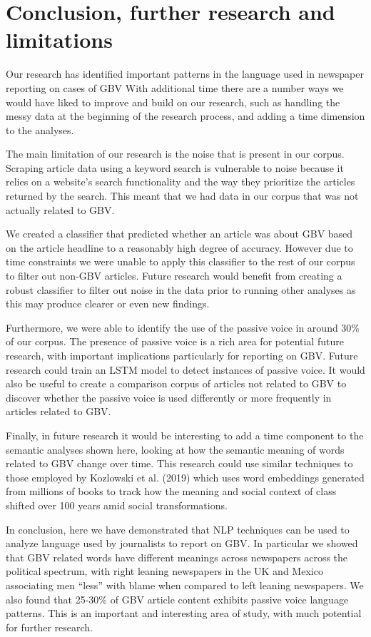 \documentclass{article}
\begin{document}
\section{Conclusion, further research and limitations}{
Our research has identified important patterns in the language used in newspaper reporting on cases of GBV  With additional time there are a number ways we would have liked to improve and build on our research, such as handling the messy data at the beginning of the research process, and adding a time dimension to the analyses.

The main limitation of our research is the noise that is present in our corpus. Scraping article data using a keyword search is vulnerable to noise because it relies on a website’s search functionality and the way they prioritize the articles returned by the search. This meant that we had data in our corpus that was not actually related to GBV. 

We created a classifier that predicted whether an article was about GBV based on the article headline to a reasonably high degree of accuracy. However due to time constraints we were unable to apply this classifier to the rest of our corpus to filter out non-GBV articles. Future research would benefit from creating a robust classifier to filter out noise in the data prior to running other analyses as this may produce clearer or even new findings.

Furthermore, we were able to identify the use of the passive voice in around 30\% of our corpus. The presence of passive voice is a rich area for potential future research, with important implications particularly for reporting on GBV. Future research could train an LSTM model to detect instances of passive voice. It would also be useful to create a comparison corpus of articles not related to GBV to discover whether the passive voice is used differently or more frequently in articles related to GBV. 

Finally, in future research it would be interesting to add a time component to the semantic analyses shown here, looking at how the semantic meaning of words related to GBV change over time. This research could use similar techniques to those employed by Kozlowski et al. (2019) which uses word embeddings generated from millions of books to track how the meaning and social context of class shifted over 100 years amid social transformations.

In conclusion, here we have demonstrated that NLP techniques can be used to analyze language used by journalists to report on GBV. In particular we showed that GBV related words have different meanings across newspapers across the political spectrum, with right leaning newspapers in the UK and Mexico associating men “less” with blame when compared to left leaning newspapers. We also found that 25-30\% of GBV article content exhibits passive voice language patterns. This is an important and interesting area of study, with much potential for further research. 

}
\end{document}
